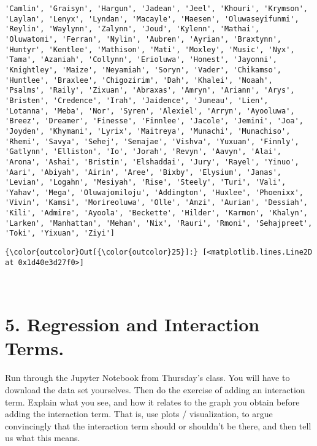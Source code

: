 \documentclass[11pt]{article}
\begin{document}
\begin{Verbatim}[commandchars=\\\{\}]
'Camlin', 'Graisyn', 'Hargun', 'Jadean', 'Jeel', 'Khouri', 'Krymson', 'Laylan', 'Lenyx', 'Lyndan', 'Macayle', 'Maesen', 'Oluwaseyifunmi', 'Reylin', 'Waylynn', 'Zalynn', 'Joud', 'Kylenn', 'Mathai', 'Oluwatomi', 'Ferran', 'Nylin', 'Aubren', 'Ayrian', 'Braxtynn', 'Huntyr', 'Kentlee', 'Mathison', 'Mati', 'Moxley', 'Music', 'Nyx', 'Tama', 'Azaniah', 'Collynn', 'Erioluwa', 'Honest', 'Jayonni', 'Knightley', 'Maize', 'Neyamiah', 'Soryn', 'Vader', 'Chikamso', 'Huntlee', 'Braxlee', 'Chigozirim', 'Dah', 'Khalei', 'Noaah', 'Psalms', 'Raily', 'Zixuan', 'Abraxas', 'Amryn', 'Ariann', 'Arys', 'Bristen', 'Credence', 'Irah', 'Jaidence', 'Juneau', 'Lien', 'Lotanna', 'Meba', 'Nor', 'Syren', 'Alexiel', 'Arryn', 'Ayooluwa', 'Breez', 'Dreamer', 'Finesse', 'Finnlee', 'Jacole', 'Jemini', 'Joa', 'Joyden', 'Khymani', 'Lyrix', 'Maitreya', 'Munachi', 'Munachiso', 'Rhemi', 'Savya', 'Sehej', 'Semajae', 'Vishva', 'Yuxuan', 'Finnly', 'Gatlynn', 'Elliston', 'Io', 'Jorah', 'Revyn', 'Aavyn', 'Alai', 'Arona', 'Ashai', 'Bristin', 'Elshaddai', 'Jury', 'Rayel', 'Yinuo', 'Aari', 'Abiyah', 'Airin', 'Aree', 'Bixby', 'Elysium', 'Janas', 'Levian', 'Logahn', 'Mesiyah', 'Rise', 'Steely', 'Turi', 'Vali', 'Yahav', 'Mega', 'Oluwajomiloju', 'Addington', 'Huxlee', 'Phoenixx', 'Vivin', 'Kamsi', 'Morireoluwa', 'Olle', 'Amzi', 'Aurian', 'Dessiah', 'Kili', 'Admire', 'Ayoola', 'Beckette', 'Hilder', 'Karmon', 'Khalyn', 'Larken', 'Manhattan', 'Mehan', 'Nix', 'Rauri', 'Rmoni', 'Sehajpreet', 'Toki', 'Yixuan', 'Ziyi']

    \end{Verbatim}

\begin{Verbatim}[commandchars=\\\{\}]
{\color{outcolor}Out[{\color{outcolor}25}]:} [<matplotlib.lines.Line2D at 0x1d40e3d27f0>]
\end{Verbatim}
            
    \begin{center}
    \end{center}
    { \hspace*{\fill} \\}
    
    \section{5. Regression and Interaction
Terms.}\label{regression-and-interaction-terms.}

Run through the Jupyter Notebook from Thursday's class. You will have to
download the data set yourselves. Then do the exercise of adding an
interaction term. Explain what you see, and how it relates to the graph
you obtain before adding the interaction term. That is, use plots /
visualization, to argue convincingly that the interaction term should or
shouldn't be there, and then tell us what this means.
\end{document}
